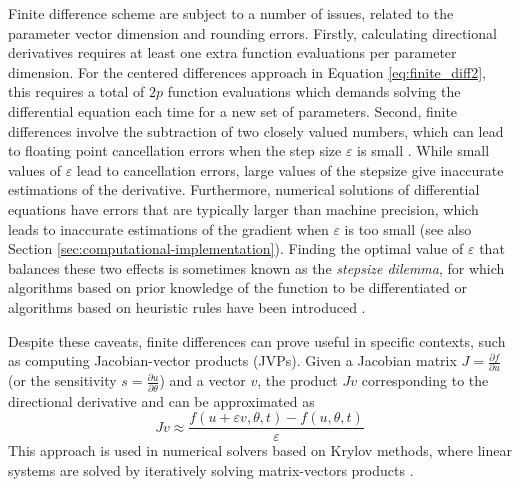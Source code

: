 Finite difference scheme are subject to a number of issues, related to the parameter vector dimension and rounding errors.
Firstly, calculating directional derivatives requires at least one extra function evaluations per parameter dimension.
For the centered differences approach in Equation \eqref{eq:finite_diff2}, this requires a total of $2p$ function evaluations which demands solving the differential equation each time for a new set of parameters.
Second, finite differences involve the subtraction of two closely valued numbers, which can lead to floating point cancellation errors when the step size $\varepsilon$ is small \cite{Goldberg_1991_floatingpoint}. 
While small values of $\varepsilon$ lead to cancellation errors, large values of the stepsize give inaccurate estimations of the derivative. 
Furthermore, numerical solutions of differential equations have errors that are typically larger than machine precision, which leads to inaccurate estimations of the gradient when $\varepsilon$ is too small (see also Section \ref{sec:computational-implementation}).
Finding the optimal value of $\varepsilon$ that balances these two effects is sometimes known as the \textit{stepsize dilemma}, for which algorithms based on prior knowledge of the function to be differentiated or algorithms based on heuristic rules have been introduced \cite{mathur2012stepsize-finitediff, BARTON_1992_finite_diff, SUNDIALS-hindmarsh2005sundials}. 

Despite these caveats, finite differences can prove useful in specific contexts, such as computing Jacobian-vector products (JVPs). 
Given a Jacobian matrix $J = \frac{\partial f}{\partial u}$ (or the sensitivity $s = \frac{\partial u}{\partial \theta}$) and a vector $v$, the product $Jv$ corresponding to the directional derivative and can be approximated as 
\begin{equation}
    Jv \approx \frac{f(u + \varepsilon v, \theta, t) - f(u, \theta, t)}{\varepsilon}
\end{equation}
This approach is used in numerical solvers based on Krylov methods, where linear systems are solved by iteratively solving matrix-vectors products \cite{Ipsen_Meyer_1998}.


